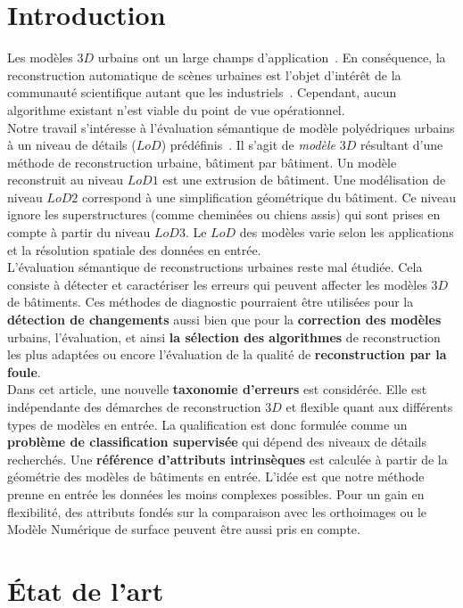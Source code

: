 \documentclass[a4paper,french]{article}
\begin{document}
    \section{Introduction}
    Les modèles $3D$ urbains ont un large champs d'application~\cite{Biljecki2015}. En conséquence, la reconstruction automatique de scènes urbaines est l'objet d'intérêt de la communauté scientifique autant que les industriels~\cite{Musialski2012}. Cependant, aucun algorithme existant n'est viable du point de vue opérationnel.\\
    Notre travail s'intéresse à l'évaluation sémantique de modèle polyédriques urbains à un niveau de détails ($LoD$) prédéfinis~\cite{kolbe2005citygml}. Il s'agit de \textit{modèle} $3D$ résultant d'une méthode de reconstruction urbaine, bâtiment par bâtiment. Un modèle reconstruit au niveau $LoD 1$ est une extrusion de bâtiment. Une modélisation de niveau $LoD 2$ correspond à une simplification géométrique du bâtiment. Ce niveau ignore les superstructures (comme cheminées ou chiens assis) qui sont prises en compte à partir du niveau $LoD 3$. Le $LoD$ des modèles varie selon les applications et la résolution spatiale des données en entrée.\\
    L'évaluation sémantique de reconstructions urbaines reste mal étudiée. Cela consiste à détecter et caractériser les erreurs qui peuvent affecter les modèles $3D$ de bâtiments. Ces méthodes de diagnostic pourraient être utilisées pour la \textbf{détection de changements} aussi bien que pour la \textbf{correction des modèles} urbains, l'évaluation, et ainsi \textbf{la sélection des algorithmes} de reconstruction les plus adaptées ou encore l'évaluation de la qualité de \textbf{reconstruction par la foule}.\\
    Dans cet article, une nouvelle \textbf{taxonomie d'erreurs} est considérée. Elle est indépendante des démarches de reconstruction $3D$ et flexible quant aux différents types de modèles en entrée. La qualification est donc formulée comme un \textbf{problème de classification supervisée} qui dépend des niveaux de détails recherchés. Une \textbf{référence d'attributs intrinsèques} est calculée à partir de la géométrie des modèles de bâtiments en entrée. L'idée est que notre méthode prenne en entrée les données les moins complexes possibles. Pour un gain en flexibilité, des attributs fondés sur la comparaison avec les orthoimages ou le Modèle Numérique de surface peuvent être aussi pris en compte.

    \section{\'Etat de l'art}
\end{document}

